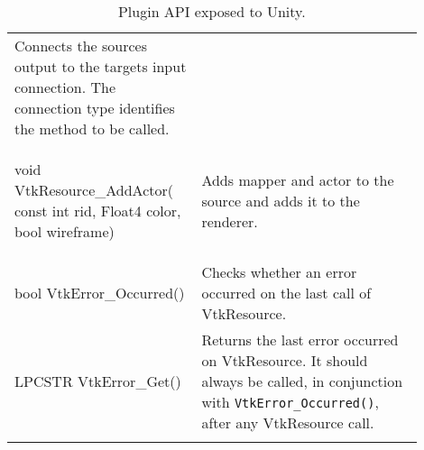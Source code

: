 \begin{appendices}
\begin{landscape}
\begin{longtable}[c]{
			>{\raggedright\arraybackslash}p{0.4\linewidth}
			>{\raggedright\arraybackslash}p{0.5\linewidth}
		}
	Connects the sources output to the targets input connection. The connection type identifies the method to be called.
	\\
	\begin{codify}
	void VtkResource_AddActor(
		const int rid,
		Float4 color,
		bool wireframe)
	\end{codify} &
	Adds mapper and actor to the source and adds it to the renderer.
	\\
	\begin{codify}
	bool VtkError_Occurred()
	\end{codify} &
	Checks whether an error occurred on the last call of VtkResource.
	\\
	\begin{codify}
	LPCSTR VtkError_Get()
	\end{codify} &
	Returns the last error occurred on VtkResource. It should always be called, in conjunction with \verb|VtkError_Occurred()|, after any VtkResource call.
	\\
	\caption{Plugin API exposed to Unity.}
	\label{tab:plugin-api}\\
	\end{longtable}
\end{landscape}


\end{appendices}
